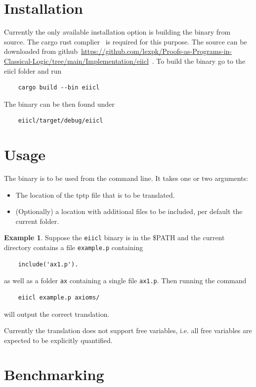 \documentclass[a4paper,11pt]{report}
\theoremstyle{definition}
\theoremstyle{definition}
\theoremstyle{definition}
\theoremstyle{definition}
\theoremstyle{definition}
\theoremstyle{definition}
\newtheorem{example}[theorem]{Example}
\theoremstyle{definition}
\begin{document}
	\section{Installation}
	
	Currently the only available installation option is building the binary from source. The cargo rust complier~\cite{rust} is required for this purpose. The source can be downloaded from github~\url{https://github.com/lexpk/Proofs-as-Programs-in-Classical-Logic/tree/main/Implementation/eiicl}~\cite{implementation}. To build the binary go to the eiicl folder and run
	\begin{lstlisting}
	cargo build --bin eiicl
	\end{lstlisting}
	The binary can be then found under 
	\begin{lstlisting}
	eiicl/target/debug/eiicl
	\end{lstlisting}
	
	\section{Usage}
	
	The binary is to be used from the command line. It takes one or two arguments:
	\begin{itemize}
		\item The location of the tptp file that is to be translated.
		\item (Optionally) a location with additional files to be included, per default the current folder.
	\end{itemize}
	\begin{example}
		Suppose the \lstinline|eiicl| binary is in the \$PATH and the current directory contains a file \lstinline|example.p| containing
		\begin{lstlisting}
	include('ax1.p').
		\end{lstlisting}
		as well as a folder \lstinline|ax| containing a single file \lstinline|ax1.p|.
	Then running the command
	\begin{lstlisting}
 	eiicl example.p axioms/
	\end{lstlisting}
	will output the correct translation.
	\end{example}
	Currently the translation does not support free variables, i.e. all free variables are expected to be explicitly quantified.
	
	\section{Benchmarking}
	
\end{document}
